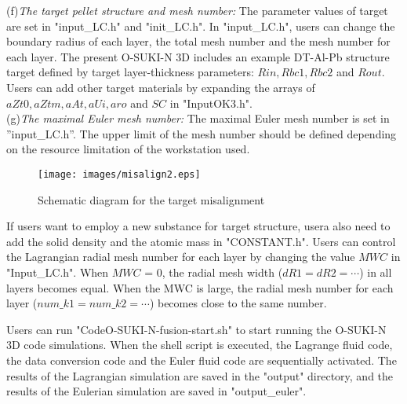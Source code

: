 \begin{small}
{(f)\em The target pellet structure and mesh number:} The parameter values of target are set in "input\_LC.h" and "init\_LC.h". In "input\_LC.h", users can change the boundary radius of each layer, the total mesh number and the mesh number for each layer. The present O-SUKI-N 3D includes an example DT-Al-Pb structure target defined by target layer-thickness parameters: $Rin, Rbc1, Rbc2$ and $Rout$. Users can add other target materials by expanding the arrays of $aZt0, aZtm, aAt, aUi, aro$ and $SC$ in "InputOK3.h". \\
{(g)\em The maximal Euler mesh number:} The maximal Euler mesh number is set in ''input\_LC.h''. The upper limit of the mesh number should be defined depending on the resource limitation of the workstation used.


\begin{figure}[H]
\centering
\texttt{[image: images/misalign2.eps]}
\caption{Schematic diagram for the target misalignment}\label{misalign}
\end{figure}

If users want to employ a new substance for target structure, usera also need to add the solid density and the atomic mass in "CONSTANT.h". Users can control the Lagrangian radial mesh number for each layer by changing the value $MWC$ in "Input\_LC.h". When $MWC$ = 0, the radial mesh width ($dR1 = dR2 = \cdots$) in all layers becomes equal. When the MWC is large, the radial mesh number for each layer ($num\_k1 = num\_k2 = \cdots$) becomes close to the same number.\\
\end{small}%
\par
Users can run "CodeO-SUKI-N-fusion-start.sh" to start running the O-SUKI-N 3D code simulations. When the shell script is executed, the Lagrange fluid code, the data conversion code and the Euler fluid code are sequentially activated. The results of the Lagrangian simulation are saved in the "output" directory, and the results of the Eulerian simulation are saved in "output\_euler". 
%